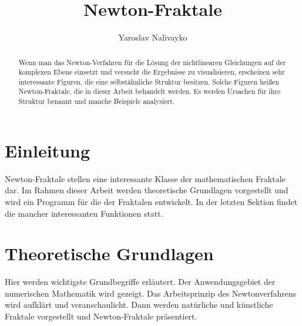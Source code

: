 \documentclass[a4paper,12pt]{llncs}
\numberwithin{equation}{section}
\begin{document}


\author{Yaroslav Nalivayko}

\title{Newton-Fraktale}

\maketitle

\thispagestyle{empty}

\begin{abstract}
Wenn man das Newton-Verfahren für die Lösung der nichtlinearen Gleichungen auf der komplexen Ebene einsetzt und versucht die Ergebnisse zu visualisieren, erscheinen sehr interessante Figuren, die eine selbstähnliche Struktur besitzen.
Solche Figuren heißen Newton-Fraktale, die in dieser Arbeit behandelt werden.
Es werden Ursachen für ihre Struktur benannt und manche Beispiele analysiert. 
\end{abstract}

\section{Einleitung}
Newton-Fraktale stellen eine interessante Klasse der mathematischen Fraktale dar. 
Im Rahmen dieser Arbeit werden theoretische Grundlagen vorgestellt und wird ein Programm für die  der Fraktalen entwickelt.
In der letzten Sektion findet die  mancher interessanten Funktionen statt.


\section{Theoretische Grundlagen}\label{sec:theo}
Hier werden wichtigste Grundbegriffe erläutert. 
Der Anwendungsgebiet der numerischen Mathematik wird gezeigt.
Das Arbeitsprinzip des Newtonverfahrens wird aufklärt und veranschaulicht.
Dann werden natürliche und künstliche Fraktale vorgestellt und Newton-Fraktale präsentiert.
\end{document}
